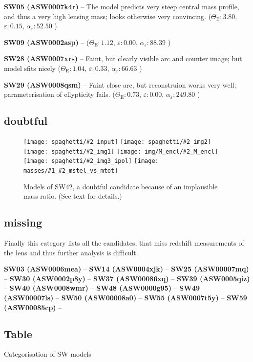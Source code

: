 \documentclass[fleqn,usenatbib]{mnras}
\newcommand{\inclfig}[2]{
  \centering
	\texttt{[image: spaghetti/\#2\_input]}%
	\texttt{[image: spaghetti/\#2\_img2]}
	\texttt{[image: spaghetti/\#2\_img1]}%
	\texttt{[image: img/M\_encl/\#2\_M\_encl]}
	\texttt{[image: spaghetti/\#2\_img3\_ipol]}%
	\texttt{[image: masses/\#1\_\#2\_mstel\_vs\_mtot]}
}
\newcommand{\lenstitle}[1]{\noindent\textbf{#1} --}
\newcommand{\params}[3]{(\(\Theta_\text{E}:#1\), $\varepsilon:#2$, $\alpha_\varepsilon:#3$ )}
\begin{document}
\lenstitle{SW05 (ASW0007k4r)}
The model predicts very steep central mass profile, and thus a very high lensing mass;
looks otherwise very convincing.
\params{3.80}{0.15}{52.50}
  
\lenstitle{SW09 (ASW0002asp)}
\params{1.12}{0.00}{88.39}
  
\lenstitle{SW28 (ASW0007xrs)}
Faint, but clearly visible arc and counter image;
but model sfits nicely
\params{1.04}{0.33}{66.63}
 
\lenstitle{SW29 (ASW0008qsm)}
Faint close arc, but reconstruion works very well;
parameterisation of ellypticity fails.
\params{0.73}{0.00}{249.80}


\subsection{doubtful}

\begin{figure}
  \inclfig{SW42}{ASW00096rm_4Q3YCEWGLN}
  \caption{Models of SW42, a doubtful candidate because of an
    implausible mass ratio. (See text for details.)}
  \label{fig:SW42}
\end{figure}







\subsection{missing}

Finally this category lists all the candidates, that miss redshift measurements of the lens and thus further analysis is difficult.

\lenstitle{SW03 (ASW0006mea)}
\lenstitle{SW14 (ASW0004xjk)}
\lenstitle{SW25 (ASW00007mq)}
\lenstitle{SW30 (ASW0002p8y)}
\lenstitle{SW37 (ASW00086xq)}
\lenstitle{SW39 (ASW0005qiz)}
\lenstitle{SW40 (ASW0008wmr)}
\lenstitle{SW48 (ASW0000g95)}
\lenstitle{SW49 (ASW00007ls)}
\lenstitle{SW50 (ASW00008a0)}
\lenstitle{SW55 (ASW0007t5y)}
\lenstitle{SW59 (ASW00085cp)}


\subsection{Table}

\begin{table}
  \caption{Categorisation of SW models}
  \label{tab:models}
  
\end{table}
\end{document}
